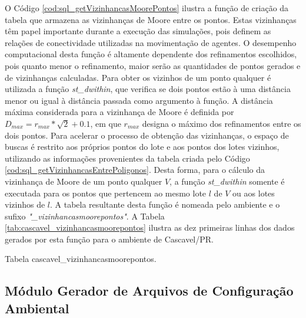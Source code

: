 O Código \ref{cod:sql_getVizinhancasMoorePontos} ilustra a função de criação da tabela que armazena as vizinhanças de Moore entre os pontos. Estas vizinhanças têm papel importante durante a execução das simulações, pois definem as relações de conectividade utilizadas na movimentação de agentes. O desempenho computacional desta função é altamente dependente dos refinamentos escolhidos, pois quanto menor o refinamento, maior serão as quantidades de pontos gerados e de vizinhanças calculadas. Para obter os vizinhos de um ponto qualquer é utilizada a função \textit{st\_dwithin}, que verifica se dois pontos estão à uma distância menor ou igual à distância passada como argumento à função. A distância máxima considerada para a vizinhança de Moore é definida por $D_{max} = r_{max} * \sqrt{2} + 0.1$, em que $r_{max}$ designa o máximo dos refinamentos entre os dois pontos. Para acelerar o processo de obtenção das vizinhanças, o espaço de buscas é restrito aos próprios pontos do lote e aos pontos dos lotes vizinhos, utilizando as informações provenientes da tabela criada pelo Código \ref{cod:sql_getVizinhancasEntrePoligonos}. Desta forma, para o cálculo da vizinhança de Moore de um ponto qualquer $V$, a função \textit{st\_dwithin} somente é executada para os pontos que pertencem ao mesmo lote $l$ de $V$ ou aos lotes vizinhos de $l$. A tabela resultante desta função é nomeada pelo ambiente e o sufixo \textit{"\_vizinhancasmoorepontos"}. A Tabela \ref{tab:cascavel_vizinhancasmoorepontos} ilustra as dez primeiras linhas dos dados gerados por esta função para o ambiente de Cascavel/PR.



\begin{table}[H]
\centering
{}
\caption{Tabela cascavel\_vizinhancasmoorepontos.}
\label{tab:cascavel_vizinhancasmoorepontos}
\end{table}

\newpage

\subsection{Módulo Gerador de Arquivos de Configuração Ambiental}

